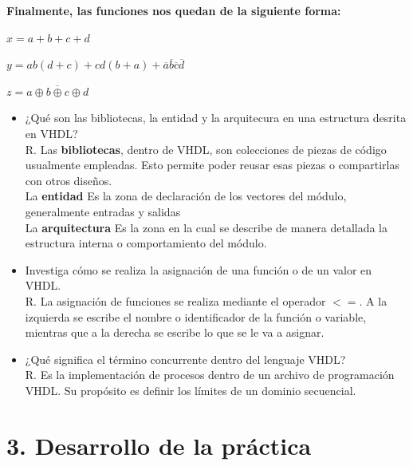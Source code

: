 \documentclass[letterpaper]{article} %
\begin{document}
    \textbf{Finalmente, las funciones nos quedan de la siguiente forma:}
    \vspace{0.5cm}


        $x = a + b + c + d$

        \vspace{0.5cm}

        $y  = ab(d + c) + cd(b + a) + \overline{a}\overline{b}\overline{c}\overline{d}$
    
        \vspace{0.5cm}

        $z = \overline{a \oplus b \oplus c \oplus d}$
        
        \vspace{0.5cm}

    \begin{itemize}
        \item ¿Qu\'e son las bibliotecas, la entidad y la arquitecura en una estructura desrita en VHDL?\\
            R. Las \textbf{bibliotecas}, dentro de VHDL, son colecciones de piezas de código usualmente empleadas.
            Esto permite poder reusar esas piezas o compartirlas con otros diseños.\\
            La \textbf{entidad} Es la zona de declaraci\'on de los vectores del m\'odulo, generalmente 
            entradas y salidas \\
            La \textbf{arquitectura} Es la zona en la cual se describe de manera detallada la estructura interna
            o comportamiento del m\'odulo.
        \item Investiga c\'omo se realiza la asignaci\'on de una funci\'on o de un valor en VHDL. \\
            R. La asignaci\'on de funciones se realiza mediante el operador $<=$. A la izquierda se escribe el nombre o identificador
            de la funci\'on o variable, mientras que a la derecha se escribe lo que se le va a asignar.
        \item ¿Qu\'e significa el t\'ermino concurrente dentro del lenguaje VHDL? \\
            R. Es la implementaci\'on de procesos dentro de un archivo de programaci\'on VHDL. Su prop\'osito es definir
            los l\'imites de un dominio secuencial.
    \end{itemize}


    \section*{3. Desarrollo de la pr\'actica}
\end{document}
